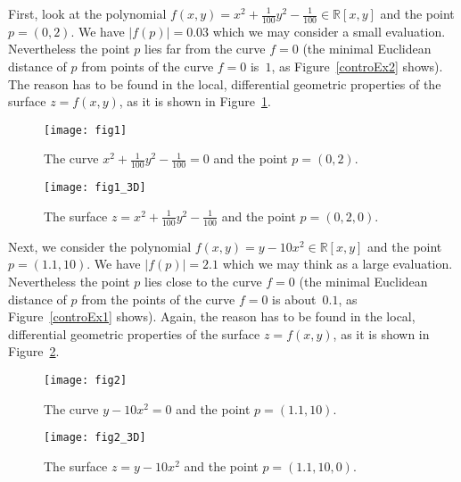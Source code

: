 \documentclass[10pt]{article}
\newcommand\R{{\mathbb R}}
\begin{document}
First, look at  the polynomial $f(x,y) =x^2+ \frac{1}{100}y^2-\frac{1}{100}
\in \R[x, y]$ and the point $p=(0,2)$. We have $|f(p)| = 0.03$ 
which  we may consider  a small evaluation. Nevertheless the point $p$ 
lies far from the curve $f=0$ (the minimal Euclidean distance of $p$ 
from points of the curve $f=0$ is~$1$,  as Figure~\ref{controEx2} shows).
The reason has to be found in the local, differential geometric properties of the  surface $z=f(x,y)$, as it is shown in Figure~\ref{controEx2D}.
\begin{figure}[htb]
\centering
\begin{minipage}[c]{0.45\textwidth}
\centering
\texttt{[image: fig1]}
\caption{{\small The curve $x^2+ \frac{1}{100}y^2-\frac{1}{100}=0$
and the point $p=(0,2)$.}}
\label{controEx2}
\end{minipage}%
\hspace{0.3cm}
\begin{minipage}[c]{0.48\textwidth}
\centering
\texttt{[image: fig1\_3D]}
\caption{{\small The surface $z=x^2+ \frac{1}{100}y^2-\frac{1}{100}$
and the point $p=(0,2,0)$.}}
\label{controEx2D}
\end{minipage}
\end{figure}

Next, 
we consider the polynomial $f(x,y)=y-10x^2 \in \R[x,y]$ 
and the point $p=(1.1, 10)$. We have $|f(p)| = 2.1$ which we may think as  
a large evaluation. Nevertheless the point $p$ lies close to the curve $f=0$
(the minimal Euclidean distance of $p$ from the points of the curve $f=0$
is about~$0.1$,  as Figure~\ref{controEx1} shows).
Again, the reason has to be found in the local, differential geometric properties of the  surface $z=f(x,y)$, as it is shown in
 Figure~\ref{controEx1D}.
\begin{figure}[htb]
\centering
\begin{minipage}[c]{0.45\textwidth}
\centering
\texttt{[image: fig2]}
\caption{{\small The curve $y-10x^2=0$
and the point $p=(1.1,10)$.}}
\label{controEx1}
\end{minipage}%
\hspace{0.3cm}
\begin{minipage}[c]{0.48\textwidth}
\centering
\texttt{[image: fig2\_3D]}
\caption{{\small The surface $z=y-10x^2$
and the point $p=(1.1,10,0)$.}}
\label{controEx1D}
\end{minipage}
\end{figure}
\end{document}
